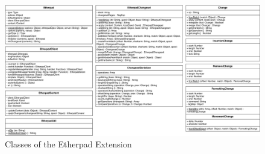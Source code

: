 \clearpage
\newpage

\begin{landscape}
  \begin{figure}[htb]
    \centerline{\includegraphics[width=\linewidth]{images/ClassesEtherpad}}
    \caption{Classes of the Etherpad Extension}
    \label{fig:classes_etherpad}
  \end{figure}
\end{landscape}

\clearpage
\newpage

